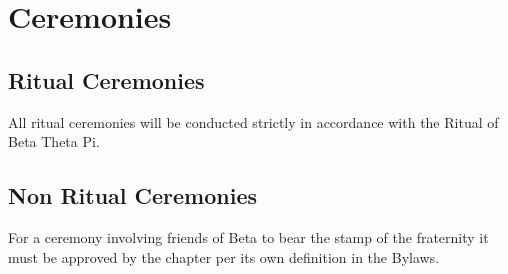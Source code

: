 \chapter{Ceremonies}
\label{cha:ceremonies}

\section{Ritual Ceremonies}
\label{sec:ritual-ceremonies}

All ritual ceremonies will be conducted strictly in accordance with the Ritual
of Beta Theta Pi.

\section{Non Ritual Ceremonies}
\label{sec:non-ritual-ceremonies}

For a ceremony involving friends of Beta to bear the stamp of the fraternity it
must be approved by the chapter per its own definition in the Bylaws.

